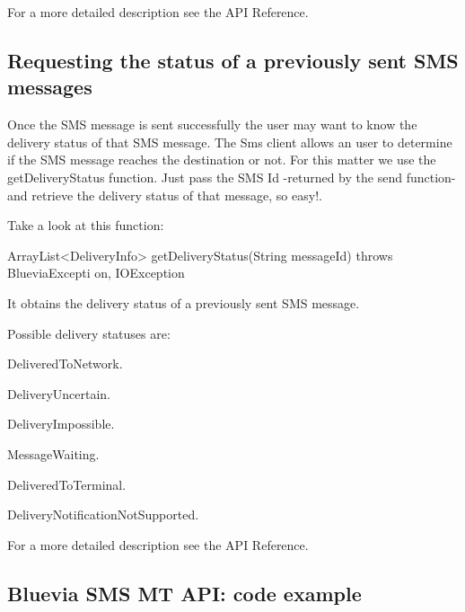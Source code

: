 For a more detailed description see the API Reference.\hypertarget{blv_sms_mt_guide_requesting_the_status_of_a_previously_sent_SMS_messages}{}\subsection{Requesting the status of a previously sent SMS messages}\label{blv_sms_mt_guide_requesting_the_status_of_a_previously_sent_SMS_messages}
Once the SMS message is sent successfully the user may want to know the delivery status of that SMS message. The Sms client allows an user to determine if the SMS message reaches the destination or not. For this matter we use the getDeliveryStatus function. Just pass the SMS Id -\/returned by the send function-\/ and retrieve the delivery status of that message, so easy!.

Take a look at this function: 
\begin{DoxyCode}
ArrayList<DeliveryInfo> getDeliveryStatus(String messageId) throws BlueviaExcepti
      on, IOException 
\end{DoxyCode}
 It obtains the delivery status of a previously sent SMS message.

Possible delivery statuses are: 
\begin{DoxyItemize}
\item DeliveredToNetwork. 
\item DeliveryUncertain. 
\item DeliveryImpossible. 
\item MessageWaiting. 
\item DeliveredToTerminal. 
\item DeliveryNotificationNotSupported. 
\end{DoxyItemize}

For a more detailed description see the API Reference.\hypertarget{blv_sms_mo_guide_blv_sms_api_code_example}{}\subsection{Bluevia SMS MT API: code example}\label{blv_sms_mo_guide_blv_sms_api_code_example}

